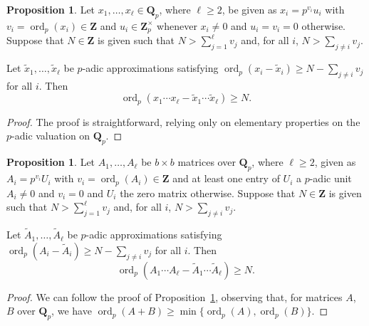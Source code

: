 \documentclass[a4paper,11pt]{article}
\numberwithin{equation}{section}
\DeclareMathOperator{\ord}{ord}          %
\theoremstyle{definition}
\newtheorem{prop}[thm]{Proposition}
\begin{document}
\begin{prop} \label{prop:productval}
Let $x_1, \dotsc, x_{\ell} \in \mathbf{Q}_p$, where $\ell \geq 2$, 
be given as $x_i = p^{v_i} u_i$ with $v_i = \ord_p(x_i) \in \mathbf{Z}$ 
and $u_i \in \mathbf{Z}_p^{\times}$ whenever $x_i \neq 0$ and 
$u_i = v_i = 0$ otherwise.  Suppose that $N \in \mathbf{Z}$ is given 
such that $N > \sum_{j=1}^{\ell} v_j$ and, for all $i$, $N > \sum_{j \neq i} v_j$.

Let $\tilde{x}_1, \dotsc, \tilde{x}_{\ell}$ be $p$-adic approximations 
satisfying $\ord_p(x_i - \tilde{x}_i) \geq N - \sum_{j \neq i} v_j$ 
for all $i$.  Then 
\begin{equation}
\ord_p(x_1 \dotsm x_{\ell} - \tilde{x}_1 \dotsm \tilde{x}_{\ell}) \geq N.
\end{equation}
\end{prop}

\begin{proof}
The proof is straightforward, relying only on elementary properties on 
the $p$-adic valuation on $\mathbf{Q}_p$.
\end{proof}

\begin{prop} \label{prop:matrixproductval}
Let $A_1, \dotsc, A_{\ell}$ be $b \times b$ matrices over $\mathbf{Q}_p$, 
where $\ell \geq 2$, given as $A_i = p^{v_i} U_i$ with 
$v_i = \ord_p(A_i) \in \mathbf{Z}$ and at least one entry of $U_i$ a 
$p$-adic unit $A_i \neq 0$ and $v_i = 0$ and $U_i$ the zero matrix 
otherwise.  Suppose that $N \in \mathbf{Z}$ is given such that 
$N > \sum_{j=1}^{\ell} v_j$ and, for all $i$, $N > \sum_{j \neq i} v_j$.

Let $\tilde{A}_1, \dotsc, \tilde{A}_{\ell}$ be $p$-adic approximations 
satisfying $\ord_p(A_i - \tilde{A}_i) \geq N - \sum_{j \neq i} v_j$ 
for all $i$.  Then 
\begin{equation}
\ord_p(A_1 \dotsm A_{\ell} - \tilde{A}_1 \dotsm \tilde{A}_{\ell}) \geq N.
\end{equation}
\end{prop}

\begin{proof}
We can follow the proof of Proposition~\ref{prop:productval}, 
observing that, for matrices $A$, $B$ over $\mathbf{Q}_p$, 
we have $\ord_p(A + B) \geq \min \{\ord_p(A), \ord_p(B)\}$.
\end{proof}
\end{document}
